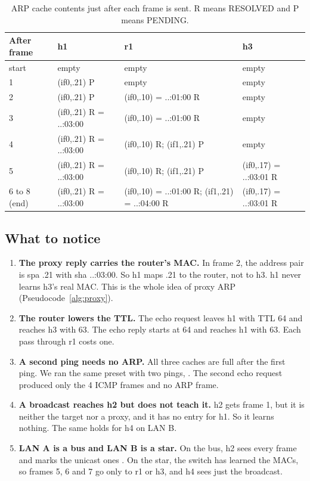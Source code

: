 \begin{table}[H]
\centering
\caption{ARP cache contents just after each frame is sent. R means RESOLVED and P means PENDING.}
\label{tab:e-cache}
\footnotesize
\begin{tabularx}{\linewidth}{@{}l Y Y Y@{}}
\toprule
After frame & h1 & r1 & h3 \\
\midrule
start & empty & empty & empty \\
1 & (if0,.21) P & empty & empty \\
2 & (if0,.21) P & (if0,.10) = ..:01:00 R & empty \\
3 & (if0,.21) R = ..:03:00 & (if0,.10) = ..:01:00 R & empty \\
4 & (if0,.21) R = ..:03:00 & (if0,.10) R; (if1,.21) P & empty \\
5 & (if0,.21) R = ..:03:00 & (if0,.10) R; (if1,.21) P & (if0,.17) = ..:03:01 R \\
6 to 8 (end) & (if0,.21) R = ..:03:00 & (if0,.10) = ..:01:00 R; (if1,.21) = ..:04:00 R & (if0,.17) = ..:03:01 R \\
\bottomrule
\end{tabularx}
\end{table}

\subsection{What to notice}
\begin{enumerate}[leftmargin=1.6em, itemsep=2pt]
\item \textbf{The proxy reply carries the router's MAC.} In frame 2, the address pair is spa .21 with sha ..:03:00. So h1 maps .21 to the router, not to h3. h1 never learns h3's real MAC. This is the whole idea of proxy ARP (Pseudocode~\ref{alg:proxy}).
\item \textbf{The router lowers the TTL.} The echo request leaves h1 with TTL 64 and reaches h3 with 63. The echo reply starts at 64 and reaches h1 with 63. Each pass through r1 costs one.
\item \textbf{A second ping needs no ARP.} All three caches are full after the first ping. We ran the same preset with two pings, . The second echo request produced only the 4 ICMP frames and no ARP frame.
\item \textbf{A broadcast reaches h2 but does not teach it.} h2 gets frame 1, but it is neither the target nor a proxy, and it has no entry for h1. So it learns nothing. The same holds for h4 on LAN B.
\item \textbf{LAN A is a bus and LAN B is a star.} On the bus, h2 sees every frame and marks the unicast ones . On the star, the switch has learned the MACs, so frames 5, 6 and 7 go only to r1 or h3, and h4 sees just the broadcast.
\end{enumerate}
